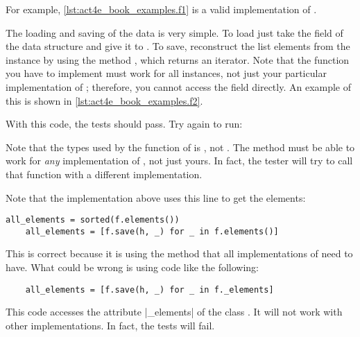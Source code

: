 For example, \cref{lst:act4e_book_examples.f1} is a valid implementation of \FiniteSet.

\begin{longcode}
    \caption{}
    \label{lst:act4e_book_examples.f1}
\end{longcode}

The loading and saving of the data is very simple.
To load just take the  field of the data structure and give it to .
To save, reconstruct the list elements from the  instance by using the method , which returns an iterator.
Note that the  function you have to implement must work for all \FiniteSet instances, not just your particular implementation of \FiniteSet; therefore, you cannot access the  field directly.
An example of this is shown in \cref{lst:act4e_book_examples.f2}.

\begin{longcode}
    \caption{}
    \label{lst:act4e_book_examples.f2}
\end{longcode}

With this code, the tests should pass.
Try again to run:


Note that the types used by the function  of  is \FiniteSet,
not .
The method must be able to work for \emph{any} implementation of  \FiniteSet,
not just yours.
In fact, the tester will try to call that function with a different implementation.

Note that the implementation above uses this line to get the elements:


\begin{verbatim}
all_elements = sorted(f.elements())
    all_elements = [f.save(h, _) for _ in f.elements()]
\end{verbatim}

This is correct because it is using the method  that all implementations of \FiniteSet need to have.
What could be wrong is using code like the following:


\begin{verbatim}
    all_elements = [f.save(h, _) for _ in f._elements]
\end{verbatim}

This code accesses the attribute \pystr|_elements| of the class .
It will not work with other implementations.
In fact, the tests will fail.
